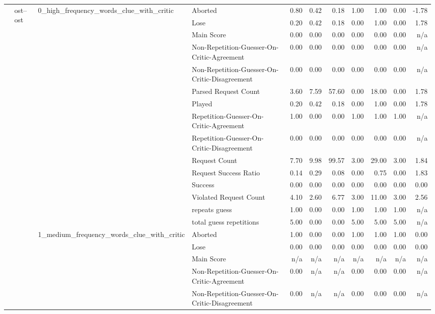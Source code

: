 \begin{tabular}{llllrrrrrrr}
\cline{2-11} \cline{3-11}
 & \multirow[t]{45}{*}{ost--ost} & \multirow[t]{15}{*}{0_high_frequency_words_clue_with_critic} & Aborted & 0.80 & 0.42 & 0.18 & 1.00 & 1.00 & 0.00 & -1.78 \\
 &  &  & Lose & 0.20 & 0.42 & 0.18 & 0.00 & 1.00 & 0.00 & 1.78 \\
 &  &  & Main Score & 0.00 & 0.00 & 0.00 & 0.00 & 0.00 & 0.00 & n/a \\
 &  &  & Non-Repetition-Guesser-On-Critic-Agreement & 0.00 & 0.00 & 0.00 & 0.00 & 0.00 & 0.00 & n/a \\
 &  &  & Non-Repetition-Guesser-On-Critic-Disagreement & 0.00 & 0.00 & 0.00 & 0.00 & 0.00 & 0.00 & n/a \\
 &  &  & Parsed Request Count & 3.60 & 7.59 & 57.60 & 0.00 & 18.00 & 0.00 & 1.78 \\
 &  &  & Played & 0.20 & 0.42 & 0.18 & 0.00 & 1.00 & 0.00 & 1.78 \\
 &  &  & Repetition-Guesser-On-Critic-Agreement & 1.00 & 0.00 & 0.00 & 1.00 & 1.00 & 1.00 & n/a \\
 &  &  & Repetition-Guesser-On-Critic-Disagreement & 0.00 & 0.00 & 0.00 & 0.00 & 0.00 & 0.00 & n/a \\
 &  &  & Request Count & 7.70 & 9.98 & 99.57 & 3.00 & 29.00 & 3.00 & 1.84 \\
 &  &  & Request Success Ratio & 0.14 & 0.29 & 0.08 & 0.00 & 0.75 & 0.00 & 1.83 \\
 &  &  & Success & 0.00 & 0.00 & 0.00 & 0.00 & 0.00 & 0.00 & 0.00 \\
 &  &  & Violated Request Count & 4.10 & 2.60 & 6.77 & 3.00 & 11.00 & 3.00 & 2.56 \\
 &  &  & repeats guess & 1.00 & 0.00 & 0.00 & 1.00 & 1.00 & 1.00 & n/a \\
 &  &  & total guess repetitions & 5.00 & 0.00 & 0.00 & 5.00 & 5.00 & 5.00 & n/a \\
\cline{3-11}
 &  & \multirow[t]{15}{*}{1_medium_frequency_words_clue_with_critic} & Aborted & 1.00 & 0.00 & 0.00 & 1.00 & 1.00 & 1.00 & 0.00 \\
 &  &  & Lose & 0.00 & 0.00 & 0.00 & 0.00 & 0.00 & 0.00 & 0.00 \\
 &  &  & Main Score & n/a & n/a & n/a & n/a & n/a & n/a & n/a \\
 &  &  & Non-Repetition-Guesser-On-Critic-Agreement & 0.00 & n/a & n/a & 0.00 & 0.00 & 0.00 & n/a \\
 &  &  & Non-Repetition-Guesser-On-Critic-Disagreement & 0.00 & n/a & n/a & 0.00 & 0.00 & 0.00 & n/a \\

\end{tabular}
